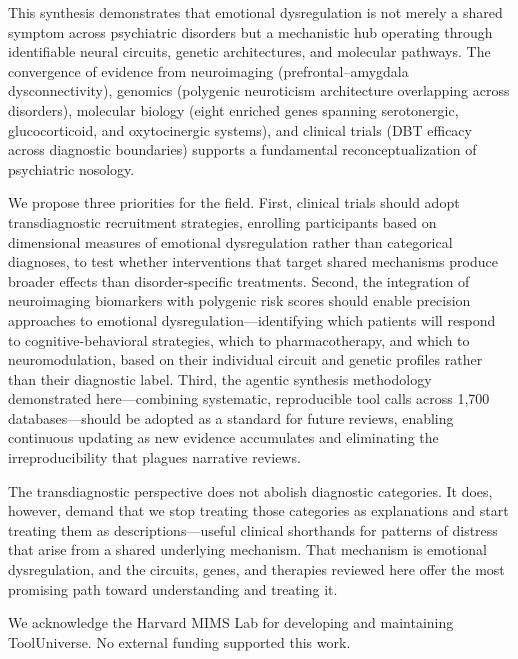 \documentclass[10pt]{article}
\begin{document}
{\TSBody
This synthesis demonstrates that emotional dysregulation is not merely a shared symptom across psychiatric disorders but a mechanistic hub operating through identifiable neural circuits, genetic architectures, and molecular pathways. The convergence of evidence from neuroimaging (prefrontal--amygdala dysconnectivity), genomics (polygenic neuroticism architecture overlapping across disorders), molecular biology (eight enriched genes spanning serotonergic, glucocorticoid, and oxytocinergic systems), and clinical trials (DBT efficacy across diagnostic boundaries) supports a fundamental reconceptualization of psychiatric nosology.

We propose three priorities for the field. First, clinical trials should adopt transdiagnostic recruitment strategies, enrolling participants based on dimensional measures of emotional dysregulation rather than categorical diagnoses, to test whether interventions that target shared mechanisms produce broader effects than disorder-specific treatments. Second, the integration of neuroimaging biomarkers with polygenic risk scores should enable precision approaches to emotional dysregulation---identifying which patients will respond to cognitive-behavioral strategies, which to pharmacotherapy, and which to neuromodulation, based on their individual circuit and genetic profiles rather than their diagnostic label. Third, the agentic synthesis methodology demonstrated here---combining systematic, reproducible tool calls across 1,700 databases---should be adopted as a standard for future reviews, enabling continuous updating as new evidence accumulates and eliminating the irreproducibility that plagues narrative reviews.

The transdiagnostic perspective does not abolish diagnostic categories. It does, however, demand that we stop treating those categories as explanations and start treating them as descriptions---useful clinical shorthands for patterns of distress that arise from a shared underlying mechanism. That mechanism is emotional dysregulation, and the circuits, genes, and therapies reviewed here offer the most promising path toward understanding and treating it.\par}

\vspace{\TSGrid}
\TSRule[TSStrong]{\linewidth}{0.6pt}
\vspace{\TSGrid}

{\sansfont\TSStep\bfseries{}\par}
\vspace{\TSHalf}
{\TSBody\small
We acknowledge the Harvard MIMS Lab for developing and maintaining ToolUniverse.
No external funding supported this work.\par}
\end{document}
